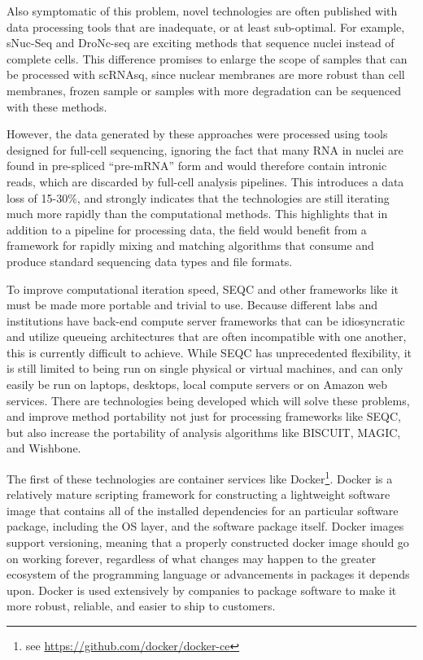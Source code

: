 Also symptomatic of this problem, novel technologies are often published with data processing tools that are inadequate, or at least sub-optimal. 
For example, sNuc-Seq \citep{Habib2016} and DroNc-seq \citep{Habib2017} are exciting methods that sequence nuclei instead of complete cells.
This difference promises to enlarge the scope of samples that can be processed with scRNAsq, since nuclear membranes are more robust than cell membranes, frozen sample or samples with more degradation can be sequenced with these methods. 

However, the data generated by these approaches were processed using tools designed for full-cell sequencing, ignoring the fact that many RNA in nuclei are found in pre-spliced ``pre-mRNA'' form and would therefore contain intronic reads, which are discarded by full-cell analysis pipelines. 
This introduces a data loss of 15-30\%, and strongly indicates that the technologies are still iterating much more rapidly than the computational methods. 
This highlights that in addition to a pipeline for processing data, the field would benefit from a framework for rapidly mixing and matching algorithms that consume and produce standard sequencing data types and file formats.  

To improve computational iteration speed, SEQC and other frameworks like it must be made more portable and trivial to use. 
Because different labs and institutions have back-end compute server frameworks that can be idiosyncratic and utilize queueing architectures that are often incompatible with one another, this is currently difficult to achieve. 
While SEQC has unprecedented flexibility, it is still limited to being run on single physical or virtual machines, and can only easily be run on laptops, desktops, local compute servers or on Amazon web services. 
There are technologies being developed which will solve these problems, and improve method portability not just for processing frameworks like SEQC, but also increase the portability of analysis algorithms like BISCUIT, MAGIC, and Wishbone.  

The first of these technologies are container services like Docker\footnote{see \url{https://github.com/docker/docker-ce}}. 
Docker is a relatively mature scripting framework for constructing a lightweight software image that contains all of the installed dependencies for an particular software package, including the OS layer, and the software package itself. 
Docker images support versioning, meaning that a properly constructed docker image should go on working forever, regardless of what changes may happen to the greater ecosystem of the programming language or advancements in packages it depends upon. 
Docker is used extensively by companies to package software to make it more robust, reliable, and easier to ship to customers. 

